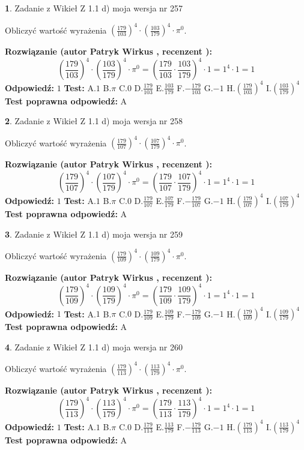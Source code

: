 \documentclass[12pt, a4paper]{article}
\theoremstyle{definition} %
\newtheorem{zad}{}
\newcommand{\zadStart}[1]{\begin{zad}#1\newline}
\newcommand{\zadStop}{\end{zad}}
\newcommand{\rozwStart}[2]{\noindent \textbf{Rozwiązanie (autor #1 , recenzent #2): }\newline}
\newcommand{\rozwStop}{\newline}
\newcommand{\odpStart}{\noindent \textbf{Odpowiedź:}\newline}
\newcommand{\odpStop}{\newline}
\newcommand{\testStart}{\noindent \textbf{Test:}\newline}
\newcommand{\testStop}{\newline}
\newcommand{\kluczStart}{\noindent \textbf{Test poprawna odpowiedź:}\newline}
\newcommand{\kluczStop}{\newline}
\begin{document}
\zadStart{Zadanie z Wikieł Z 1.1 d) moja wersja nr 257}

Obliczyć wartość wyrażenia $(\frac{179}{103})^{4} \cdot (\frac{103}{179})^{4} \cdot \pi^{0}$.
\zadStop
\rozwStart{Patryk Wirkus}{}
$$(\frac{179}{103})^{4} \cdot (\frac{103}{179})^{4} \cdot \pi^{0} = (\frac{179}{103} \cdot \frac{103}{179})^{4} \cdot 1 = 1^{4} \cdot 1 = 1$$
\rozwStop
\odpStart
$1$
\odpStop
\testStart
A.$1$ B.$\pi$ C.$0$ D.$\frac{179}{103}$ E.$\frac{103}{179}$
F.$-\frac{179}{103}$ G.$-1$
H.$(\frac{179}{103})^{4}$
I.$(\frac{103}{179})^{4}$
\testStop
\kluczStart
A
\kluczStop



\zadStart{Zadanie z Wikieł Z 1.1 d) moja wersja nr 258}

Obliczyć wartość wyrażenia $(\frac{179}{107})^{4} \cdot (\frac{107}{179})^{4} \cdot \pi^{0}$.
\zadStop
\rozwStart{Patryk Wirkus}{}
$$(\frac{179}{107})^{4} \cdot (\frac{107}{179})^{4} \cdot \pi^{0} = (\frac{179}{107} \cdot \frac{107}{179})^{4} \cdot 1 = 1^{4} \cdot 1 = 1$$
\rozwStop
\odpStart
$1$
\odpStop
\testStart
A.$1$ B.$\pi$ C.$0$ D.$\frac{179}{107}$ E.$\frac{107}{179}$
F.$-\frac{179}{107}$ G.$-1$
H.$(\frac{179}{107})^{4}$
I.$(\frac{107}{179})^{4}$
\testStop
\kluczStart
A
\kluczStop



\zadStart{Zadanie z Wikieł Z 1.1 d) moja wersja nr 259}

Obliczyć wartość wyrażenia $(\frac{179}{109})^{4} \cdot (\frac{109}{179})^{4} \cdot \pi^{0}$.
\zadStop
\rozwStart{Patryk Wirkus}{}
$$(\frac{179}{109})^{4} \cdot (\frac{109}{179})^{4} \cdot \pi^{0} = (\frac{179}{109} \cdot \frac{109}{179})^{4} \cdot 1 = 1^{4} \cdot 1 = 1$$
\rozwStop
\odpStart
$1$
\odpStop
\testStart
A.$1$ B.$\pi$ C.$0$ D.$\frac{179}{109}$ E.$\frac{109}{179}$
F.$-\frac{179}{109}$ G.$-1$
H.$(\frac{179}{109})^{4}$
I.$(\frac{109}{179})^{4}$
\testStop
\kluczStart
A
\kluczStop



\zadStart{Zadanie z Wikieł Z 1.1 d) moja wersja nr 260}

Obliczyć wartość wyrażenia $(\frac{179}{113})^{4} \cdot (\frac{113}{179})^{4} \cdot \pi^{0}$.
\zadStop
\rozwStart{Patryk Wirkus}{}
$$(\frac{179}{113})^{4} \cdot (\frac{113}{179})^{4} \cdot \pi^{0} = (\frac{179}{113} \cdot \frac{113}{179})^{4} \cdot 1 = 1^{4} \cdot 1 = 1$$
\rozwStop
\odpStart
$1$
\odpStop
\testStart
A.$1$ B.$\pi$ C.$0$ D.$\frac{179}{113}$ E.$\frac{113}{179}$
F.$-\frac{179}{113}$ G.$-1$
H.$(\frac{179}{113})^{4}$
I.$(\frac{113}{179})^{4}$
\testStop
\kluczStart
A
\kluczStop
\end{document}
